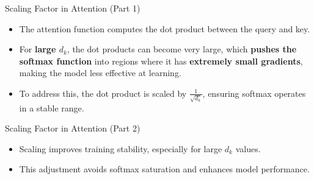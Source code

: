 \documentclass[serif, aspectratio=169]{beamer}
\begin{document}
\begin{frame}{Scaling Factor in Attention (Part 1)}
	\begin{itemize}
		\item The attention function computes the dot product between the query and key. 
		\item For \textbf{large $d_k$}, the dot products can become very large, which \textbf{pushes the softmax function} into regions where it has \textbf{extremely small gradients}, making the model less effective at learning.
		\item To address this, the dot product is scaled by $\frac{1}{\sqrt{d_k}}$, ensuring softmax operates in a stable range.
	\end{itemize}
\end{frame}

\begin{frame}{Scaling Factor in Attention (Part 2)}
	\begin{itemize}
		\item Scaling improves training stability, especially for large $d_k$ values.
		\item This adjustment avoids softmax saturation and enhances model performance.
	\end{itemize}
\end{frame}
\end{document}
